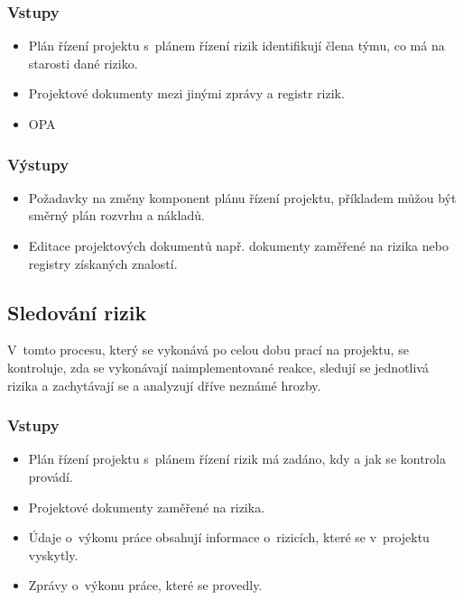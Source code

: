 \subsubsection*{Vstupy}
\begin{itemize}
    \item Plán řízení projektu s~plánem řízení rizik identifikují člena týmu, co má na starosti dané riziko.
    \item Projektové dokumenty mezi jinými zprávy a registr rizik.
    \item OPA
\end{itemize}
\subsubsection*{Výstupy}
\begin{itemize}
    \item Požadavky na změny komponent plánu řízení projektu, příkladem můžou být směrný plán rozvrhu a nákladů.
    \item Editace projektových dokumentů např. dokumenty zaměřené na rizika nebo registry získaných znalostí.
\end{itemize}

\subsection*{Sledování rizik} 

V~tomto procesu, který se vykonává po celou dobu prací na projektu, se kontroluje, zda se vykonávají naimplementované reakce, sledují se jednotlivá rizika a zachytávají se a analyzují dříve neznámé hrozby.

\subsubsection*{Vstupy}
\begin{itemize}
    \item Plán řízení projektu s~plánem řízení rizik má zadáno, kdy a jak se kontrola provádí.
    \item Projektové dokumenty zaměřené na rizika.
    \item Údaje o~výkonu práce obsahují informace o~rizicích, které se v~projektu vyskytly.
    \item Zprávy o~výkonu práce, které se provedly.
\end{itemize}
